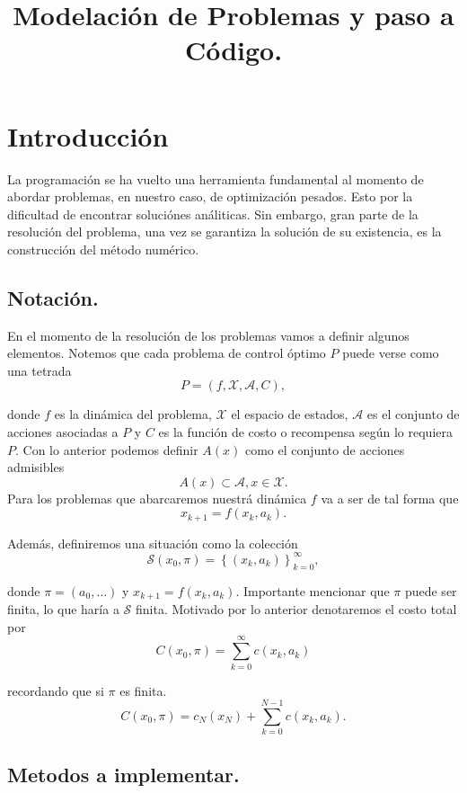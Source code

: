 \documentclass[oneside,spanish]{amsbook}
\numberwithin{section}{chapter}
\numberwithin{equation}{section}
\numberwithin{figure}{section}
\begin{document}
\title{Modelación de Problemas y paso a Código.}

\maketitle


\chapter{Introducción}

La programación se ha vuelto una herramienta fundamental al momento
de abordar problemas, en nuestro caso, de optimización pesados. Esto
por la dificultad de encontrar soluciónes análiticas. Sin embargo,
gran parte de la resolución del problema, una vez se garantiza la
solución de su existencia, es la construcción del método numérico. 

\section{Notación. }

En el momento de la resolución de los problemas vamos a definir algunos
elementos. Notemos que cada problema de control óptimo $P$ puede
verse como una tetrada
\[
P=\left(f,\mathcal{X},\mathcal{A},C\right),
\]

donde $f$ es la dinámica del problema, $\mathcal{X}$ el espacio
de estados, $\mathcal{A}$ es el conjunto de acciones asociadas a
$P$ y $C$ es la función de costo o recompensa según lo requiera
$P.$ Con lo anterior podemos definir $A\left(x\right)$ como el conjunto
de acciones admisibles 
\[
A\left(x\right)\subset\mathcal{A},x\in\mathcal{X}.
\]
Para los problemas que abarcaremos nuestrá dinámica $f$ va a ser
de tal forma que 
\[
x_{k+1}=f\left(x_{k},a_{k}\right).
\]

Además, definiremos una situación como la colección 
\[
\mathcal{S}\left(x_{0},\pi\right)=\left\{ \left(x_{k},a_{k}\right)\right\} _{k=0}^{\infty},
\]

donde $\pi=\left(a_{0},\ldots\right)$ y $x_{k+1}=f\left(x_{k},a_{k}\right)$.
Importante mencionar que $\pi$ puede ser finita, lo que haría a $\mathcal{S}$
finita. Motivado por lo anterior denotaremos el costo total por 
\[
C\left(x_{0},\pi\right)=\sum_{k=0}^{\infty}c(x_{k},a_{k})
\]

recordando que si $\pi$ es finita. 
\[
C\left(x_{0},\pi\right)=c_{N}(x_{N})+\sum_{k=0}^{N-1}c(x_{k},a_{k}).
\]


\section{Metodos a implementar. }
\end{document}
